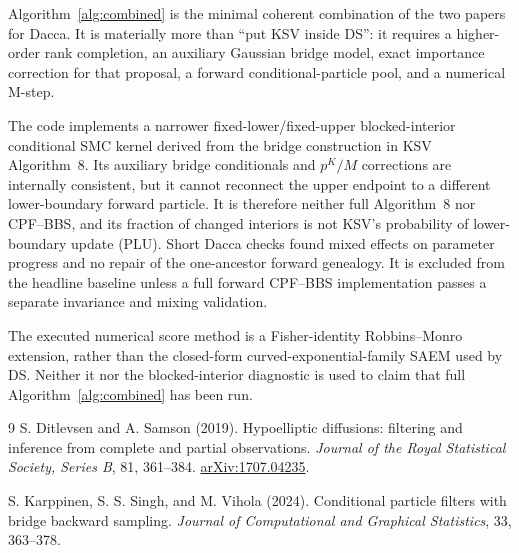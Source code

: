 \documentclass[11pt]{article}
\begin{document}
Algorithm~\ref{alg:combined} is the minimal coherent combination of the two
papers for Dacca.  It is materially more than ``put KSV inside DS'': it requires
a higher-order rank completion, an auxiliary Gaussian bridge model, exact
importance correction for that proposal, a forward conditional-particle pool,
and a numerical M-step.

The code implements a narrower fixed-lower/fixed-upper blocked-interior
conditional SMC kernel derived from the bridge construction in KSV
Algorithm~8.  Its auxiliary bridge conditionals and $p^K/M$ corrections are
internally consistent, but it cannot reconnect the upper endpoint to a
different lower-boundary forward particle.  It is therefore neither full
Algorithm~8 nor CPF--BBS, and its fraction of changed interiors is not KSV's
probability of lower-boundary update (PLU).  Short Dacca checks found mixed
effects on parameter progress and no repair of the one-ancestor forward
genealogy.  It is excluded from the headline baseline unless a full forward
CPF--BBS implementation passes a separate invariance and mixing validation.

The executed numerical score method is a Fisher-identity Robbins--Monro
extension, rather than the closed-form curved-exponential-family SAEM used by
DS.  Neither it nor the blocked-interior diagnostic is used to claim that full
Algorithm~\ref{alg:combined} has been run.

\begin{thebibliography}{9}
S. Ditlevsen and A. Samson (2019).
Hypoelliptic diffusions: filtering and inference from complete and partial
observations. \emph{Journal of the Royal Statistical Society, Series B},
81, 361--384.  \href{https://arxiv.org/abs/1707.04235}{arXiv:1707.04235}.

S. Karppinen, S. S. Singh, and M. Vihola (2024).
Conditional particle filters with bridge backward sampling.
\emph{Journal of Computational and Graphical Statistics}, 33, 363--378.
\end{thebibliography}
\end{document}
